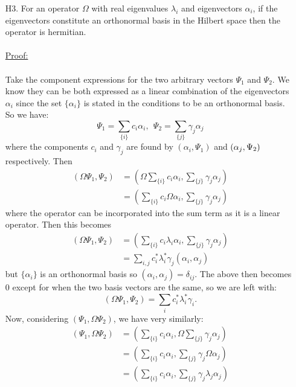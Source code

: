 \begin{enumerate}
    \item[H3.] For an operator $\Omega$ with real eigenvalues $\lambda_{i}$ and eigenvectors $\alpha_{i}$, if the eigenvectors constitute an orthonormal basis in the Hilbert space then the operator is hermitian.\\\\
    \underline{Proof:}\\\\
    Take the component expressions for the two arbitrary vectors $\Psi_{1}$ and $\Psi_{2}$. We know they can be both expressed as a linear combination of the eigenvectors $\alpha_{i}$ since the set $\{\alpha_{i}\}$ is stated in the conditions to be an orthonormal basis. So we have:
    $$
    \Psi_{1}=\sum_{\{i\}}c_{i}\alpha_{i},\:\:\Psi_{2}=\sum_{\{j\}}\gamma_{j}\alpha_{j}
    $$
    where the components $c_{i}$ and $\gamma_{j}$ are found by $(\alpha_{i},\Psi_{1})$ and $\oip{\alpha_{j}}{\Psi_{2}}$ respectively. Then 
    $$
    \begin{aligned}
    (\Omega\Psi_{1},\Psi_{2})&=\left(\Omega\sum_{\{i\}}c_{i}\alpha_{i},\sum_{\{j\}}\gamma_{j}\alpha_{j}\right)\\
    &=\left(\sum_{\{i\}}c_{i}\Omega\alpha_{i},\sum_{\{j\}}\gamma_{j}\alpha_{j}\right)
    \end{aligned}
    $$
    where the operator can be incorporated into the sum term as it is a linear operator. Then this becomes
    $$
    \begin{aligned}
    (\Omega\Psi_{1},\Psi_{2}) &= \left(\sum_{\{i\}}c_{i}\lambda_{i}\alpha_{i},\sum_{\{j\}}\gamma_{j}\alpha_{j}\right)\\
    &=\sum_{i,j}c^{\ast}_{i}\lambda_{i}^{\ast}\gamma_{j}(\alpha_{i},\alpha_{j})
    \end{aligned}
    $$
    but $\{\alpha_{i}\}$ is an orthonormal basis so $(\alpha_{i},\alpha_{j})=\delta_{ij}$. The above then becomes $0$ except for when the two basis vectors are the same, so we are left with:
    $$
    (\Omega\Psi_{1},\Psi_{2})=\sum_{i}c^{\ast}_{i}\lambda^{\ast}_{i}\gamma_{i}.
    $$
    Now, considering $(\Psi_{1},\Omega\Psi_{2})$, we have very similarly:
    $$
    \begin{aligned}
    (\Psi_{1},\Omega\Psi_{2})&=\left(\sum_{\{i\}}c_{i}\alpha_{i},\Omega\sum_{\{j\}}\gamma_{j}\alpha_{j}\right)\\
    &=\left(\sum_{\{i\}}c_{i}\alpha_{i},\sum_{\{j\}}\gamma_{j}\Omega\alpha_{j}\right)\\
    &= \left(\sum_{\{i\}}c_{i}\alpha_{i},\sum_{\{j\}}\gamma_{j}\lambda_{j}\alpha_{j}\right)\\

\end{aligned}$$
\end{enumerate}
